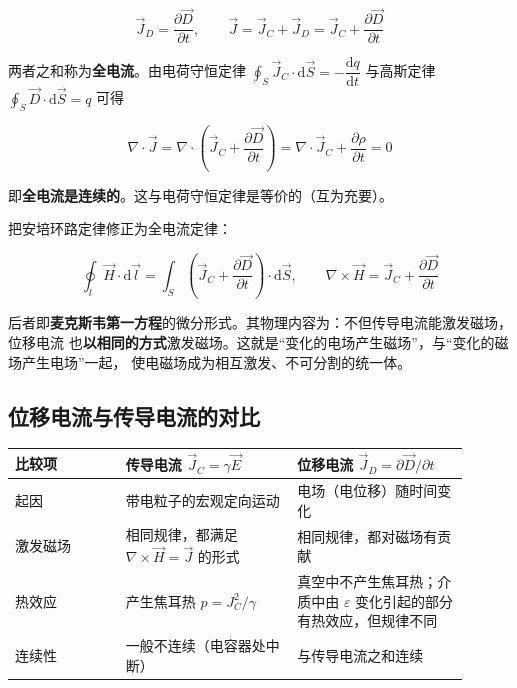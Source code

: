 \begin{formulaBox}
\[
\vec{J}_D=\frac{\partial \vec{D}}{\partial t},
\qquad
\vec{J}=\vec{J}_C+\vec{J}_D=\vec{J}_C+\frac{\partial \vec{D}}{\partial t}
\]
\end{formulaBox}

两者之和称为\textbf{全电流}。由电荷守恒定律 $\oint_S\vec{J}_C\cdot \mathrm{d}\vec{S}
=-\dfrac{\mathrm{d}q}{\mathrm{d}t}$ 与高斯定律 $\oint_S\vec{D}\cdot \mathrm{d}\vec{S}=q$ 可得

\[
\nabla\cdot \vec{J}=\nabla\cdot\left(\vec{J}_C+\frac{\partial \vec{D}}{\partial t}\right)
=\nabla\cdot \vec{J}_C+\frac{\partial \rho}{\partial t}=0
\]

即\textbf{全电流是连续的}。这与电荷守恒定律是等价的（互为充要）。

把安培环路定律修正为全电流定律：

\begin{formulaBox}
\[
\oint_{l}\vec{H}\cdot \mathrm{d}\vec{l}
=\int_{S}\left(\vec{J}_C+\frac{\partial \vec{D}}{\partial t}\right)\cdot \mathrm{d}\vec{S},
\qquad
\nabla\times \vec{H}=\vec{J}_C+\frac{\partial \vec{D}}{\partial t}
\]
\end{formulaBox}

后者即\textbf{麦克斯韦第一方程}的微分形式。其物理内容为：不但传导电流能激发磁场，位移电流
也\textbf{以相同的方式}激发磁场。这就是“变化的电场产生磁场”，与“变化的磁场产生电场”一起，
使电磁场成为相互激发、不可分割的统一体。

\subsection{位移电流与传导电流的对比}

\begin{center}
\begin{tabular}{@{}p{0.22\linewidth}p{0.34\linewidth}p{0.34\linewidth}@{}}
\toprule
\textbf{比较项} & \textbf{传导电流} $\vec{J}_C=\gamma\vec{E}$ & \textbf{位移电流} $\vec{J}_D=\partial\vec{D}/\partial t$ \\
\midrule
起因 & 带电粒子的宏观定向运动 & 电场（电位移）随时间变化 \\
激发磁场 & 相同规律，都满足 $\nabla\times\vec{H}=\vec{J}$ 的形式 & 相同规律，都对磁场有贡献 \\
热效应 & 产生焦耳热 $p=J_C^2/\gamma$ & 真空中不产生焦耳热；介质中由 $\varepsilon$ 变化引起的部分有热效应，但规律不同 \\
连续性 & 一般不连续（电容器处中断） & 与传导电流之和连续 \\
\bottomrule
\end{tabular}
\end{center}

